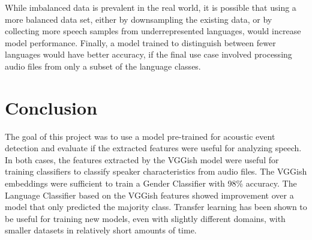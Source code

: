 While imbalanced data is prevalent in the real world, it is possible that using a more balanced data set, either by downsampling the existing data, or by collecting more speech samples from underrepresented languages, would increase model performance. Finally, a model trained to distinguish between fewer languages would have better accuracy, if the final use case involved processing audio files from only a subset of the language classes.
\section{Conclusion}
The goal of this project was to use a model pre-trained for acoustic event detection and evaluate if the extracted features were useful for analyzing speech. In both cases, the features extracted by the VGGish model were useful for training classifiers to classify speaker characteristics from audio files. The VGGish embeddings were sufficient to train a Gender Classifier with 98\% accuracy. The Language Classifier based on the VGGish features showed improvement over a model that only predicted the majority class. Transfer learning has been shown to be useful for training new models, even with slightly different domains, with smaller datasets in relatively short amounts of time.